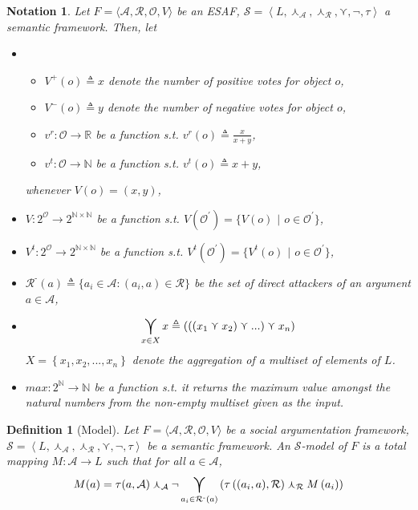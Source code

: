 \documentclass{article}
\newtheorem{definition}{Definition}
\newtheorem{notation}{Notation}
\newcommand{\nat}{\mathbb{N}}   %
\newcommand{\real}{\mathbb{R}}  %
\newcommand{\args}{\mathcal{A}} %
\newcommand{\att}{\mathcal{R}}  %
\newcommand{\valueset}{L}
\newcommand{\obj}{\mathcal{O}} %
\newcommand{\attackers}[1]{\att^\text{-}\left(#1\right)}
\newcommand{\safid}{F}               %
\newcommand{\safbodyO}{\langle \args, \att, \obj, V \rangle} %
\newcommand{\safO}{\safid = \safbodyO} %
\newcommand{\semid}{\mathcal{S}}        %
\newcommand{\sembodyNew}{\left\langle \valueset,\SAFand_\mathcal{A}, \SAFand_\mathcal{R},\SAFor,\lnot,\tau \right\rangle} %
\newcommand{\SAFand}{\curlywedge}     %
\newcommand{\SAFor}{\curlyvee}        %
\DeclareMathOperator*{\SAFOr}{\bigcurlyvee} %
\newcommand{\sem}{\mathcal{S}}
\begin{document}
\begin{notation}
Let $\safO$ be an ESAF, $\sem = \sembodyNew$ a semantic framework. Then, let
\begin{itemize}
\item
\begin{itemize}
\item $V^{+} (o) \triangleq x$ denote the number of positive votes for object $o$,
\item $V^{-} (o) \triangleq y$ denote the number of negative votes for object $o$,
\item $v^r: \obj \to \real$ be a function s.t. $v^r(o) \triangleq \frac{x}{x + y}$,
\item $v^t: \obj \to \nat$ be a function s.t. $v^t(o) \triangleq x + y$,  
\end{itemize}
whenever $V(o) = (x, y)$,
\\

\item $V: 2^\obj \to 2^{\nat \times \nat}$ be a function s.t. $V(\mathcal{O}^{'}) = \{V(o)$ $|$ $o \in \mathcal{O}^{'}\}$,
\item $V^{t}: 2^\obj \to 2^{\nat \times \nat}$ be a function s.t. $V^t(\mathcal{O}^{'}) = \{V^t(o)$ $|$ $o \in \mathcal{O}^{'}\}$,

\item $\attackers{a} \triangleq \{a_i \in \args: (a_i, a) \in \att\}$ be the set of direct attackers of an argument $a \in \args$, 
\item$$\SAFOr_{x \in X} x \triangleq\left(\left(\left(  x_{1}\SAFor x_{2}\right) \SAFor...\right)\SAFor x_{n}\right)$$ $X=\left\{  x_{1},x_{2},...,x_{n}\right\}$ denote the aggregation of a multiset of elements of $\valueset$. 

\item $max: 2^{\nat} \to \nat$ be a function s.t. it returns the maximum value amongst the natural numbers from the non-empty multiset given as the input.

\end{itemize}
\end{notation}

\begin{definition}[Model] 
\label{def:model}
  Let $\safO$ be a social argumentation framework, $\sem = \sembodyNew$ be a semantic framework. An $\semid$-model of $\safid$ is a total mapping $M : \args \rightarrow \valueset$ such that for all $a \in \args$,
  $$\displaystyle M(a) = \tau(a, \args ) \SAFand_\args \lnot \SAFOr_{a_i \in \attackers{a}} \left(\tau\left((a_i, a), \att \right) \SAFand_\att M\left(a_i\right)\right)$$
\end{definition}
\end{document}
